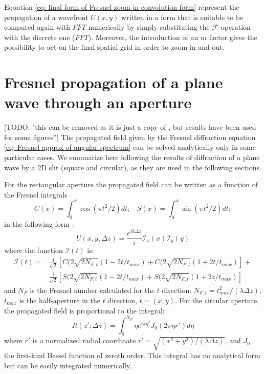 \documentclass{iucr}              %
\newcommand{\todo}[1]{{\color{red}[TODO: "#1'']}}
\begin{document}
Equation \ref{eq: final form of Fresnel zoom in convolution form} represent the propagation of a wavefront $U(x,y)$ written in a form that is suitable to be computed again with $FFT$ numerically by simply substituting the $\mathcal{F}$ operation with the discrete one ($FFT$). Moreover, the introduction of an $m$ factor gives the possibility to act on the final spatial grid in order to zoom in and out.



\section{Fresnel propagation of a plane wave through an aperture}
\label{appendix: aperture}
\todo{this can be removed as it is just a copy of \cite{goodmanfourier}, but results have been used for some figures}
The propagated field given by the Fresnel diffraction equation \ref{eq: Fresnel approx of angular spectrum} can be solved analytically only in some particular cases. We summarize here following \cite{goodmanfourier} the results of diffraction of a plane wave by a 2D slit (square and circular), as they are used in the following sections. 

For the rectangular aperture the propagated field can be written as a function of the Fresnel integrals
\begin{equation}\label{eq: fresnel integrals}
C(x) = \int_0^x \cos(\pi t^2 / 2) dt;  ~~~~ S(x) = \int_0^x \sin(\pi t^2 / 2) dt;
\end{equation}
in the following form \cite{goodmanfourier}:
\begin{equation}\label{eq: analytical rectangular slit}
U(x, y, \Delta z)= \frac{e^{i k \Delta z}}{i} \mathcal{I}_x(x) \mathcal{I}_y(y)
\end{equation}
where the function $\mathcal{I}(t)$ is: 
\begin{align}\label{eq: analytical rectangular slit}
\mathcal{I}(t) = & \frac{1}{\sqrt 2}[ C(2 \sqrt{2 N_{F,t}} (1 - 2 t /t_{max}) + C(2 \sqrt{2 N_{F,t}} (1 + 2 t /t_{max})] +\\
		 & \frac{i}{\sqrt 2}[ S(2 \sqrt{2 N_{F,t}} (1 - 2 t /t_{max}) + S(2 \sqrt{2 N_{F,t}} (1 + 2 z /t_{max})]
\end{align}
and $N_F$ is the Fresnel number calculated for the $t$ direction: $N_{F,t} = t_{max}^2 / (\lambda \Delta z)$, $t_{max}$ is the half-aperture in the $t$ direction, $t=(x,y)$.
For the circular aperture, the propagated field is proportional to the integral:
\begin{equation}\label{eq: analytical rectangular slit}
R(z'; \Delta z) = \int_0^{N_F} \eta e^{i \pi \eta^2} J_0(2 \pi \eta r') d\eta 
\end{equation}
where $r'$ is a normalized radial coordinate $r' = \sqrt{(x^2 + y^2)/(\lambda \Delta z)}$, and $J_0$ the first-kind Bessel function of zeroth order. This integral has no analytical form but can be easily integrated numerically. 
\end{document}
